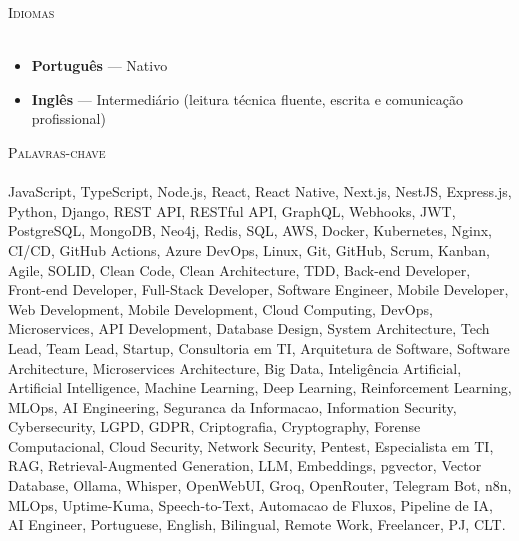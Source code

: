 \documentclass[a4paper]{article}
\newcommand{\lineunder}{
    \vspace*{-8pt} \\
    \hspace*{-18pt} \hrulefill \\
}
\newcommand{\header}[1]{
    {\hspace*{-18pt}\vspace*{6pt} \textsc{#1}}
    \vspace*{-6pt} \lineunder
}
\begin{document}
\header{Idiomas}
\vspace{2mm}
\begin{itemize}[leftmargin=*, itemsep=-2pt]
    \item \textbf{Portugu\^{e}s} — Nativo
    \item \textbf{Ingl\^{e}s} — Intermedi\'{a}rio (leitura t\'{e}cnica fluente, escrita e comunica\c{c}\~{a}o profissional)
\end{itemize}

\vspace{3mm}

\header{Palavras-chave}
\vspace{1mm}
{\small
JavaScript, TypeScript, Node.js, React, React Native, Next.js, NestJS, Express.js, Python, Django,
REST API, RESTful API, GraphQL, Webhooks, JWT, PostgreSQL, MongoDB, Neo4j, Redis, SQL,
AWS, Docker, Kubernetes, Nginx, CI/CD, GitHub Actions, Azure DevOps, Linux, Git, GitHub,
Scrum, Kanban, Agile, SOLID, Clean Code, Clean Architecture, TDD, Back-end Developer,
Front-end Developer, Full-Stack Developer, Software Engineer, Mobile Developer,
Web Development, Mobile Development, Cloud Computing, DevOps, Microservices, API Development,
Database Design, System Architecture, Tech Lead, Team Lead, Startup, Consultoria em TI,
Arquitetura de Software, Software Architecture, Microservices Architecture, Big Data,
Intelig\^encia Artificial, Artificial Intelligence, Machine Learning, Deep Learning,
Reinforcement Learning, MLOps, AI Engineering, Seguranca da Informacao,
Information Security, Cybersecurity, LGPD, GDPR, Criptografia, Cryptography,
Forense Computacional, Cloud Security, Network Security, Pentest, Especialista em TI,
RAG, Retrieval-Augmented Generation, LLM, Embeddings, pgvector, Vector Database,
Ollama, Whisper, OpenWebUI, Groq, OpenRouter, Telegram Bot, n8n, MLOps,
Uptime-Kuma, Speech-to-Text, Automacao de Fluxos, Pipeline de IA, AI Engineer,
Portuguese, English, Bilingual, Remote Work, Freelancer, PJ, CLT.
}
\end{document}
